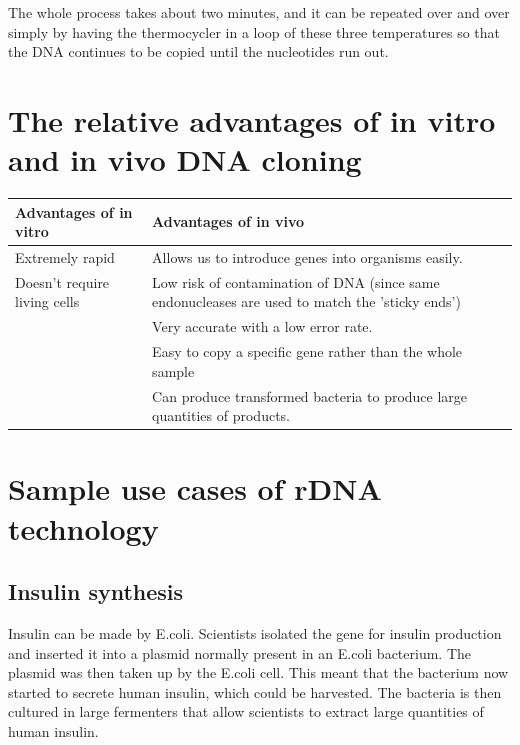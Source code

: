\documentclass{article}
\begin{document}
The whole process takes about two minutes, and it can be repeated over and over
simply by having the thermocycler in a loop of these three temperatures so that
the DNA continues to be copied until the nucleotides run out.

\section*{The relative advantages of in vitro and in vivo DNA cloning}

\begin{tabular}{|p{5.6cm}|p{5.6cm}|}
	
	\hline

	{\bf Advantages of in vitro} & {\bf Advantages of in vivo} \\ \hline

	Extremely rapid & Allows us to introduce genes into organisms easily. \\
	\hline

	Doesn't require living cells & Low risk of contamination of DNA (since same
	endonucleases are used to match the 'sticky ends') \\ \hline

	& Very accurate with a low error rate. \\ \hline

	& Easy to copy a specific gene rather than the whole sample \\ \hline

	& Can produce transformed bacteria to produce large quantities of products.
	\\ \hline

\end{tabular}

\section*{Sample use cases of rDNA technology}
\subsection*{Insulin synthesis}

Insulin can be made by E.coli. Scientists isolated the gene for insulin
production and inserted it into a plasmid normally present in an E.coli
bacterium. The plasmid was then taken up by the E.coli cell. This meant that the
bacterium now started to secrete human insulin, which could be harvested. The
bacteria is then cultured in large fermenters that allow scientists to extract
large quantities of human insulin.
\end{document}
